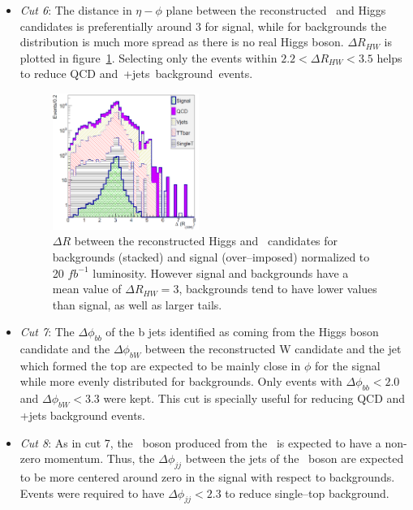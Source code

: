\begin{itemize}
\item \textit{Cut 6}: The distance in $\eta-\phi$ plane between the reconstructed \W~and Higgs candidates is preferentially around 3 for signal, while for backgrounds the distribution is much more spread as there is no real Higgs boson. $\Delta R_{HW}$ is plotted in figure~\ref{fig:Var3}. Selecting only the events within $2.2<\Delta R_{HW}<3.5$ helps to reduce QCD and~\W+jets~background~events.

\begin{figure}[!Hhtbp]
  \begin{center}
    \includegraphics[width=0.45\textwidth]{figs/Pheno/DRWH.png}
    \caption{$\Delta R$ between the reconstructed Higgs and \W~candidates for backgrounds (stacked) and signal (over--imposed) normalized to 20 $fb^{-1}$ luminosity. However signal and backgrounds have a mean value of $\Delta R_{HW}=3$, backgrounds tend to have lower values than signal, as well as larger tails.}
    \label{fig:Var3}
  \end{center}
\end{figure}

\item \textit{Cut 7}: The $\Delta \phi_{bb}$ of the b jets identified as coming from the Higgs boson candidate and the $\Delta \phi_{bW}$ between the reconstructed W candidate and the jet which formed the top are expected to be mainly close in $\phi$ for the signal while more evenly distributed for backgrounds. Only events with $\Delta \phi_{bb}<2.0$ and $\Delta \phi_{bW}<3.3$ were kept. This cut is specially useful for reducing QCD and \W+jets background events.

\item \textit{Cut 8}: As in cut 7, the \W~boson produced from the \Tp~is expected to have a non-zero momentum. Thus, the $\Delta \phi_{jj}$ between the jets of the \W~boson are expected to be more centered around zero in the signal with respect to backgrounds. Events were required to have $\Delta \phi_{jj}<2.3$ to reduce single--top background.


\end{itemize}
